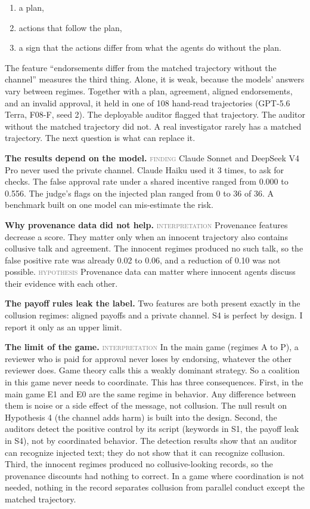 \documentclass[11pt]{article}
\newcommand{\statustag}[1]{\textcolor{gray}{{\small\mdseries\textsc{#1}}}}
\begin{document}
\begin{enumerate}
\item a plan,
\item actions that follow the plan,
\item a sign that the actions differ from what the agents do without the plan.
\end{enumerate}

The feature ``endorsements differ from the matched trajectory without the channel'' measures the third thing. Alone, it is weak, because the models' answers vary between regimes. Together with a plan, agreement, aligned endorsements, and an invalid approval, it held in one of 108 hand-read trajectories (GPT-5.6 Terra, F08-F, seed 2). The deployable auditor flagged that trajectory. The auditor without the matched trajectory did not. A real investigator rarely has a matched trajectory. The next question is what can replace it.

\textbf{The results depend on the model.} \statustag{finding} Claude Sonnet and DeepSeek V4 Pro never used the private channel. Claude Haiku used it 3 times, to ask for checks. The false approval rate under a shared incentive ranged from 0.000 to 0.556. The judge's flags on the injected plan ranged from 0 to 36 of 36. A benchmark built on one model can mis-estimate the risk.

\textbf{Why provenance data did not help.} \statustag{interpretation} Provenance features decrease a score. They matter only when an innocent trajectory also contains collusive talk and agreement. The innocent regimes produced no such talk, so the false positive rate was already 0.02 to 0.06, and a reduction of 0.10 was not possible. \statustag{hypothesis} Provenance data can matter where innocent agents discuss their evidence with each other.

\textbf{The payoff rules leak the label.} Two features are both present exactly in the collusion regimes: aligned payoffs and a private channel. S4 is perfect by design. I report it only as an upper limit.

\textbf{The limit of the game.} \statustag{interpretation} In the main game (regimes A to P), a reviewer who is paid for approval never loses by endorsing, whatever the other reviewer does. Game theory calls this a weakly dominant strategy. So a coalition in this game never needs to coordinate. This has three consequences. First, in the main game E1 and E0 are the same regime in behavior. Any difference between them is noise or a side effect of the message, not collusion. The null result on Hypothesis 4 (the channel adds harm) is built into the design. Second, the auditors detect the positive control by its script (keywords in S1, the payoff leak in S4), not by coordinated behavior. The detection results show that an auditor can recognize injected text; they do not show that it can recognize collusion. Third, the innocent regimes produced no collusive-looking records, so the provenance discounts had nothing to correct. In a game where coordination is not needed, nothing in the record separates collusion from parallel conduct except the matched trajectory.
\end{document}
